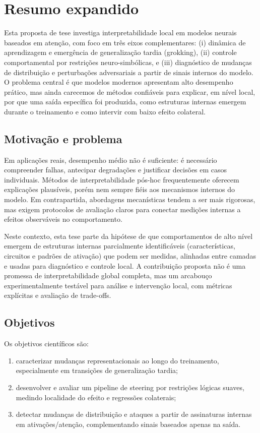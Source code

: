 \chapter{Resumo expandido}

\noindent

\vspace{0.8em}
\noindent
Esta proposta de tese investiga interpretabilidade local em modelos neurais baseados em atenção, com foco em três eixos complementares: (i) dinâmica de aprendizagem e emergência de generalização tardia (grokking), (ii) controle comportamental por restrições neuro-simbólicas, e (iii) diagnóstico de mudanças de distribuição e perturbações adversariais a partir de sinais internos do modelo. O problema central é que modelos modernos apresentam alto desempenho prático, mas ainda carecemos de métodos confiáveis para explicar, em nível local, por que uma saída específica foi produzida, como estruturas internas emergem durante o treinamento e como intervir com baixo efeito colateral.

\section*{Motivação e problema}
Em aplicações reais, desempenho médio não é suficiente: é necessário compreender falhas, antecipar degradações e justificar decisões em casos individuais. Métodos de interpretabilidade pós-hoc frequentemente oferecem explicações plausíveis, porém nem sempre fiéis aos mecanismos internos do modelo. Em contrapartida, abordagens mecanísticas tendem a ser mais rigorosas, mas exigem protocolos de avaliação claros para conectar medições internas a efeitos observáveis no comportamento.

Neste contexto, esta tese parte da hipótese de que comportamentos de alto nível emergem de estruturas internas parcialmente identificáveis (características, circuitos e padrões de ativação) que podem ser medidas, alinhadas entre camadas e usadas para diagnóstico e controle local. A contribuição proposta não é uma promessa de interpretabilidade global completa, mas um arcabouço experimentalmente testável para análise e intervenção local, com métricas explícitas e avaliação de trade-offs.

\section*{Objetivos}
Os objetivos científicos são:
\begin{enumerate}
    \item caracterizar mudanças representacionais ao longo do treinamento, especialmente em transições de generalização tardia;
    \item desenvolver e avaliar um pipeline de steering por restrições lógicas suaves, medindo localidade do efeito e regressões colaterais;
    \item detectar mudanças de distribuição e ataques a partir de assinaturas internas em ativações/atenção, complementando sinais baseados apenas na saída.
\end{enumerate}


